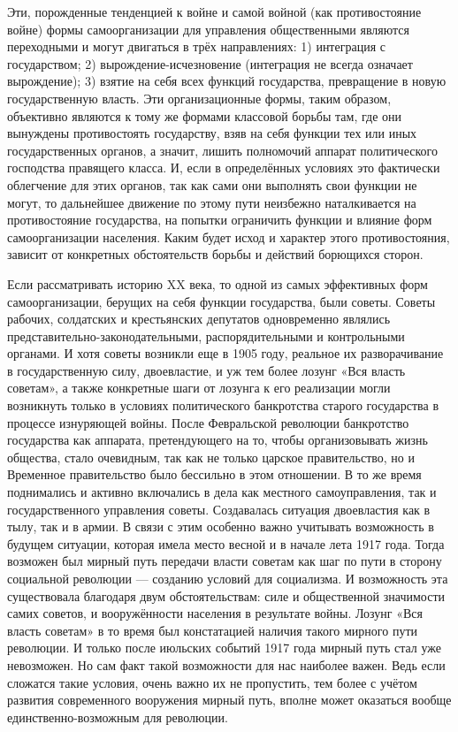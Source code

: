 \documentclass[12pt,a4paper,openany]{book}
\begin{document}
Эти, порожденные тенденцией к войне и самой войной (как противостояние войне) формы самоорганизации для управления общественными являются переходными и могут двигаться в трёх направлениях: 1) интеграция с государством; 2) вырождение-исчезновение (интеграция не всегда означает вырождение); 3) взятие на себя всех функций государства, превращение в новую государственную власть. Эти организационные формы, таким образом, объективно являются к тому же формами классовой борьбы там, где они вынуждены противостоять государству, взяв на себя функции тех или иных государственных органов, а значит, лишить полномочий аппарат политического господства правящего класса. И, если в определённых условиях это фактически облегчение для этих органов, так как сами они выполнять свои функции не могут, то дальнейшее движение по этому пути неизбежно наталкивается на противостояние государства, на попытки ограничить функции и влияние форм самоорганизации населения. Каким будет исход и характер этого противостояния, зависит от конкретных обстоятельств борьбы и действий борющихся сторон.

Если рассматривать историю XX века, то одной из самых эффективных форм самоорганизации, берущих на себя функции государства, были советы. Советы рабочих, солдатских и крестьянских депутатов одновременно являлись представительно-законодательными, распорядительными и контрольными органами. И хотя советы возникли еще в 1905 году, реальное их разворачивание в государственную силу, двоевластие, и уж тем более лозунг «Вся власть советам», а также конкретные шаги от лозунга к его реализации могли возникнуть только в условиях политического банкротства старого государства в процессе изнуряющей войны. После Февральской революции банкротство государства как аппарата, претендующего на то, чтобы организовывать жизнь общества, стало очевидным, так как не только царское правительство, но и Временное правительство было бессильно в этом отношении. В то же время поднимались и активно включались в дела как местного самоуправления, так и государственного управления советы. Создавалась ситуация двоевластия как в тылу, так и в армии. В связи с этим особенно важно учитывать возможность в будущем ситуации, которая имела место весной и в начале лета 1917 года. Тогда возможен был мирный путь передачи власти советам как шаг по пути в сторону социальной революции — созданию условий для социализма. И возможность эта существовала благодаря двум обстоятельствам: силе и общественной значимости самих советов, и вооружённости населения в результате войны. Лозунг «Вся власть советам» в то время был констатацией наличия такого мирного пути революции. И только после июльских событий 1917 года мирный путь стал уже невозможен. Но сам факт такой возможности для нас наиболее важен. Ведь если сложатся такие условия, очень важно их не пропустить, тем более с учётом развития современного вооружения мирный путь, вполне может оказаться вообще единственно-возможным для революции.
\end{document}
